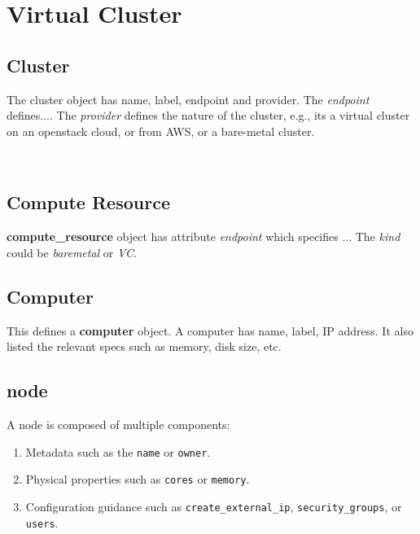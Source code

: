 \documentclass[9pt,twocolumn,twoside]{styles/osajnl}
\begin{document}

\section{Virtual Cluster}

\subsection{Cluster}

The cluster object has name, label, endpoint and provider. The \textit{endpoint}
defines.... The \textit{provider} defines the nature of the cluster,
e.g., its a virtual cluster on an openstack cloud, or from AWS, or a bare-metal
cluster.


\
\subsection{Compute Resource}

\textbf{compute\_resource} object has attribute \textit{endpoint} which
specifies ... The \textit{kind} could be \textit{baremetal} or \textit{VC}.


\subsection{Computer}

This defines a \textbf{computer} object. A computer has name, label,
IP address. It also listed the relevant specs such as memory, disk
size, etc.



\subsection{node}

A node is composed of multiple components:

\begin{enumerate}
\item Metadata such as the \verb|name| or \verb|owner|.
\item Physical properties such as \verb|cores| or \verb|memory|.
\item Configuration guidance such as \verb|create_external_ip|,
  \verb|security_groups|, or \verb|users|.
\end{enumerate}
\end{document}

